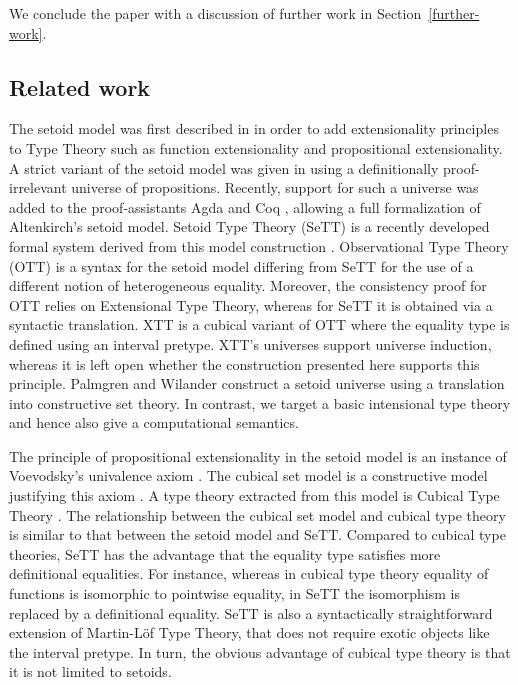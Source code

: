 \documentclass[autoref]{llncs}
\begin{document}
We conclude the paper with a discussion of further work in
Section~\ref{further-work}.

\subsection{Related work}

The setoid model was first described in \cite{hofmann} in order to add
extensionality principles to Type Theory such as function extensionality and
propositional extensionality. A strict variant of the setoid model was given in
\cite{setoid99} using a definitionally proof-irrelevant universe of
propositions. Recently, support for such a universe was added to the
proof-assistants Agda and Coq \cite{agda-prop}, allowing a full formalization of
Altenkirch's setoid model. Setoid Type Theory (SeTT) is a recently developed
formal system derived from this model construction \cite{mpc19}. Observational
Type Theory (OTT) \cite{alti:ott-conf,alti:ott-conf} is a syntax for the setoid
model differing from SeTT for the use of a different notion of heterogeneous
equality. Moreover, the consistency proof for OTT relies on Extensional Type
Theory, whereas for SeTT it is obtained via a syntactic translation.
%
XTT \cite{xtt} is a cubical variant of OTT where the equality type is defined
using an interval pretype. XTT's universes support universe induction, whereas
it is left open whether the construction presented here supports this principle.
%
Palmgren and Wilander \cite{2014arXiv1408.1364P} construct a setoid
universe using a translation into constructive set theory. In
contrast, we target a basic intensional type theory and hence also
give a computational semantics.

The principle of propositional extensionality in the setoid model is an instance
of Voevodsky's univalence axiom \cite{hottbook}. The cubical set model is a
constructive model justifying this axiom \cite{cubical-sets}. A type theory
extracted from this model is Cubical Type Theory \cite{cubical}. The
relationship between the cubical set model and cubical type theory is similar to
that between the setoid model and SeTT.
%
Compared to cubical type theories, SeTT has the advantage that the equality type
satisfies more definitional equalities. For instance, whereas in cubical type
theory equality of functions is isomorphic to pointwise equality, in SeTT the
isomorphism is replaced by a definitional equality. SeTT is also a syntactically
straightforward extension of Martin-L\"of Type Theory, that does not require
exotic objects like the interval pretype. In turn, the obvious advantage of
cubical type theory is that it is not limited to setoids.
\end{document}
